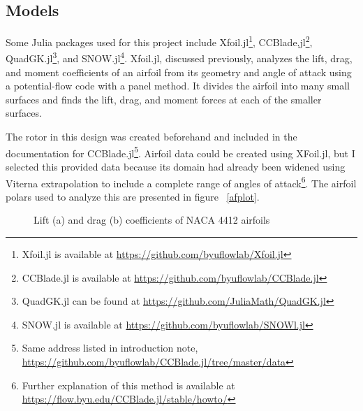 \documentclass[journal ]{new-aiaa}
\begin{document}
\subsection{Models}

Some Julia packages used for this project include Xfoil.jl\footnote{Xfoil.jl is available at \url{https://github.com/byuflowlab/Xfoil.jl}}, CCBlade,jl\footnote{CCBlade.jl is available at \url{https://github.com/byuflowlab/CCBlade.jl}}, QuadGK.jl\footnote{QuadGK.jl can be found at \url{https://github.com/JuliaMath/QuadGK.jl}}, and SNOW.jl\footnote{SNOW.jl is available at \url{https://github.com/byuflowlab/SNOWl.jl}}. Xfoil.jl, discussed previously, analyzes the lift, drag, and moment coefficients of an airfoil from its geometry and angle of attack using a potential-flow code with a panel method. It divides the airfoil into many small surfaces and finds the lift, drag, and moment forces at each of the smaller surfaces. 

The rotor in this design was created beforehand and included in the documentation for CCBlade.jl\footnote{Same address listed in introduction note, \url{https://github.com/byuflowlab/CCBlade.jl/tree/master/data}}. Airfoil data could be created using XFoil.jl, but I selected this provided data because its domain had already been widened using Viterna extrapolation to include a complete range of angles of attack\footnote{Further explanation of this method is available at \url{https://flow.byu.edu/CCBlade.jl/stable/howto/}}. The airfoil polars used to analyze this are presented in figure ~\eqref{afplot}.

\begin{figure}[H]
\centering
	\caption{Lift (a) and drag (b) coefficients of NACA 4412 airfoils}
	\captionsetup{aboveskip=0pt,font=it}
	\label{afplot}
\end{figure}
\end{document}
